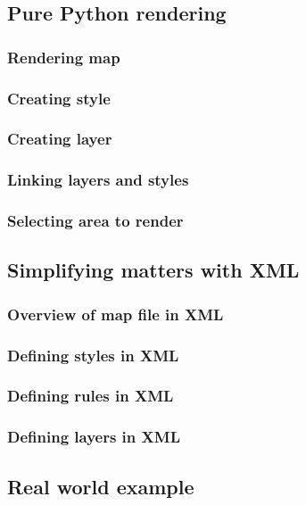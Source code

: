 \documentclass{beamer}
\begin{document}
\subsection{Pure Python rendering}

\begin{frame}
  \frametitle{Rendering map}

\end{frame}


\begin{frame}
  \frametitle{Creating style}

\end{frame}

\begin{frame}
  \frametitle{Creating layer}

\end{frame}

\begin{frame}
  \frametitle{Linking layers and styles}

\end{frame}

\begin{frame}
  \frametitle{Selecting area to render}

\end{frame}

\subsection{Simplifying matters with XML}

\begin{frame}
  \frametitle{Overview of map file in XML}

\end{frame}

\begin{frame}
  \frametitle{Defining styles in XML}

\end{frame}

\begin{frame}
  \frametitle{Defining rules in XML}

\end{frame}

\begin{frame}
  \frametitle{Defining layers in XML}

\end{frame}

\subsection{Real world example}
\end{document}

